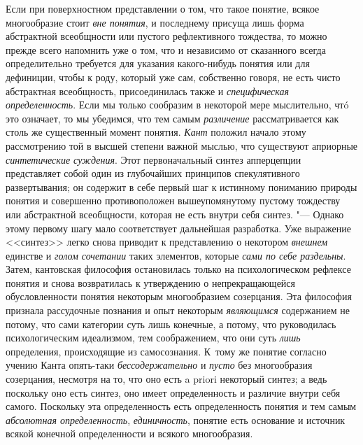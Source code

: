 {Если при поверхностном представлении о том, что такое понятие,
всякое многообразие стоит {\em вне
понятия}, и последнему присуща лишь форма абстрактной
всеобщности или пустого рефлективного тождества, то можно прежде всего
напомнить уже о том, что и независимо от сказанного всегда определительно
требуется для указания какого-нибудь понятия или для
дефиниции, чтобы к роду, который уже сам, собственно говоря, не есть чисто
абстрактная всеобщность, присоединилась также и
{\em специфическая определенность}.
Если мы только сообразим в некоторой мере мыслительно, чтó
это означает, то мы убедимся, что тем самым
{\em различение}
рассматривается как столь же существенный момент понятия.
{\em Кант} положил начало
этому рассмотрению той в высшей степени важной мыслью, что существуют
априорные {\em синтетические суждения}.
Этот первоначальный синтез апперцепции представляет собой
один из глубочайших принципов спекулятивного развертывания; он содержит в
себе первый шаг к истинному пониманию природы понятия и совершенно
противоположен вышеупомянутому пустому тождеству или абстрактной
всеобщности, которая не есть внутри себя синтез. "--- Однако
этому первому шагу мало соответствует дальнейшая разработка. Уже выражение
<<синтез>> легко снова приводит к представлению о некотором
{\em внешнем} единстве и
{\em голом сочетании}
таких элементов, которые
{\em сами по себе раздельны}.
Затем, кантовская философия остановилась только на
психологическом рефлексе понятия и снова возвратилась к утверждению о
непрекращающейся обусловленности понятия некоторым многообразием
созерцания. Эта философия признала рассудочные познания и опыт некоторым
{\em являющимся}
содержанием не потому, что сами категории суть лишь конечные,
а потому, что руководилась психологическим идеализмом, тем соображением,
что они суть {\em лишь}
определения, происходящие из самосознания. К~тому же понятие
согласно учению Канта опять-таки
{\em бессодержательно} и
{\em пусто} без
многообразия созерцания, несмотря на то, что оно есть a priori
некоторый синтез; а ведь поскольку оно есть синтез, оно имеет
определенность и различие внутри себя самого. Поскольку эта определенность
есть определенность понятия и тем самым
{\em абсолютная определенность},
{\em единичность}, понятие
есть основание и источник всякой конечной определенности и всякого
многообразия.

}

